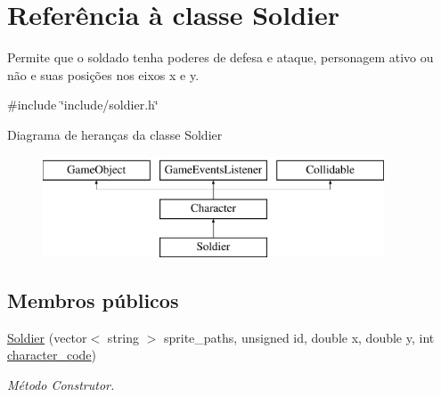 \hypertarget{classSoldier}{}\section{Referência à classe Soldier}
\label{classSoldier}


Permite que o soldado tenha poderes de defesa e ataque, personagem ativo ou não e suas posições nos eixos x e y.  




{\ttfamily \#include \char`\"{}include/soldier.\+h\char`\"{}}

Diagrama de heranças da classe Soldier\begin{figure}[H]
\begin{center}
\leavevmode
\includegraphics[height=3.000000cm]{classSoldier}
\end{center}
\end{figure}
\subsection*{Membros públicos}
\begin{DoxyCompactItemize}
\item 
\mbox{\hyperlink{classSoldier_ac0fd0515763f51a11b2785e5cac088e6}{Soldier}} (vector$<$ string $>$ sprite\+\_\+paths, unsigned id, double x, double y, int \mbox{\hyperlink{classCharacter_a3e16e9cb23edc78d774cf30925242a8e}{character\+\_\+code}})
\begin{DoxyCompactList}\small\item\em Método Construtor. \end{DoxyCompactList}\end{DoxyCompactItemize}
